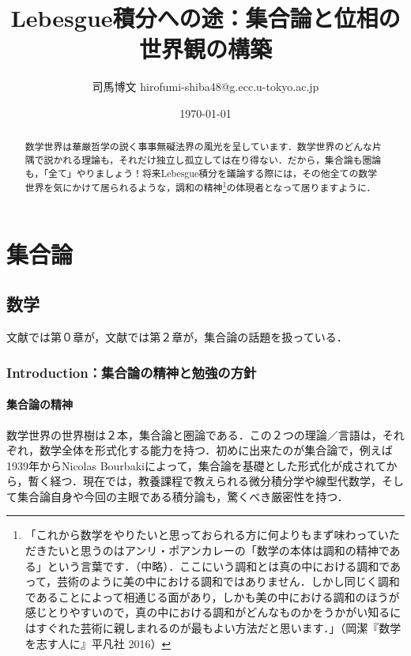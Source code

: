 \documentclass[uplatex, 12pt, a4paper, dvipdfmx]{jsreport}
\title{Lebesgue積分への途：集合論と位相の世界観の構築}
\author{司馬博文 hirofumi-shiba48@g.ecc.u-tokyo.ac.jp}
\date{\today}
\begin{document}
\maketitle
\begin{abstract}
	数学世界は華厳哲学の説く事事無礙法界の風光を呈しています．数学世界のどんな片隅で説かれる理論も，それだけ独立し孤立しては在り得ない．だから，集合論も圏論も，「全て」やりましょう！将来Lebesgue積分を議論する際には，その他全ての数学世界を気にかけて居られるような，調和の精神\footnote{「これから数学をやりたいと思っておられる方に何よりもまず味わっていただきたいと思うのはアンリ・ポアンカレーの「数学の本体は調和の精神である」という言葉です．（中略）．ここにいう調和とは真の中における調和であって，芸術のように美の中における調和ではありません．しかし同じく調和であることによって相通じる面があり，しかも美の中における調和のほうが感じとりやすいので，真の中における調和がどんなものかをうかがい知るにはすぐれた芸術に親しまれるのが最もよい方法だと思います．」（岡潔『数学を志す人に』平凡社 2016）}の体現者となって居りますように．
\end{abstract}
\tableofcontents\clearpage

\part{集合論}
\chapter{数学}

文献\cite{須之内治男}では第０章が，文献\cite{吉田洋一}では第２章が，集合論の話題を扱っている．

\section{Introduction：集合論の精神と勉強の方針}

\subsection{集合論の精神}

数学世界の世界樹は２本，集合論と圏論である．この２つの理論／言語は，それぞれ，数学全体を形式化する能力を持つ．初めに出来たのが集合論で，例えば1939年からNicolas Bourbakiによって，集合論を基礎とした形式化が成されてから，暫く経つ．現在では，教養課程で教えられる微分積分学や線型代数学，そして集合論自身や今回の主眼である積分論も，驚くべき厳密性を持つ．\par
\end{document}
